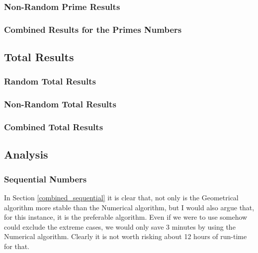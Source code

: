 \subsubsection{Non-Random Prime Results}
\label{non-random_prime_results}



\subsubsection{Combined Results for the Primes Numbers} 
\label{combined_prime}



\subsection{Total Results}
\subsubsection{Random Total Results}



\subsubsection{Non-Random Total Results}



\subsubsection{Combined Total Results}
\label{total_combined_results} 


\subsection{Analysis}

\subsubsection{Sequential Numbers}
In Section \ref{combined_sequential} it is clear that, not only is the Geometrical algorithm more stable than the Numerical algorithm, but I would also argue that, for this instance, it is the preferable algorithm. Even if we were to use somehow could exclude the extreme cases, we would only save 3 minutes by using the Numerical algorithm. Clearly it is not worth risking about 12 hours of run-time for that. 

